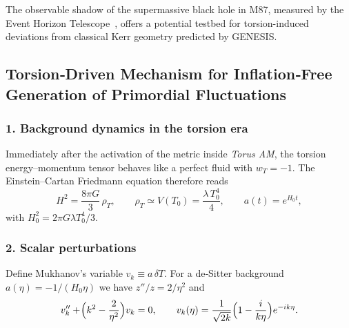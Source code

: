 \documentclass{article}
\begin{document}
The observable shadow of the supermassive black hole in M87, measured by the Event Horizon Telescope~\cite{eht2019}, offers a potential testbed for torsion-induced deviations from classical Kerr geometry predicted by GENESIS.


\medskip
\begin{center}
\end{center}
\medskip



\subsection{Torsion‑Driven Mechanism for Inflation‑Free
Generation of Primordial Fluctuations}
\label{sec:torsion_flucs}

\subsubsection*{1. Background dynamics in the torsion era}

Immediately after the activation of the metric inside
\textit{Torus AM}, the torsion energy–momentum tensor behaves
like a perfect fluid with
$w_{T}=-1$.  The Einstein–Cartan Friedmann equation therefore reads
\begin{equation}
  H^{2}=\frac{8\pi G}{3}\,\rho_{T},\qquad
  \rho_{T}\simeq V(T_{0})
  =\frac{\lambda\,T_{0}^{4}}{4},
  \qquad
  a(t)=e^{H_{0}t},
\end{equation}
with
$H_{0}^{2}=2\pi G\lambda T_{0}^{4}/3$.

\subsubsection*{2. Scalar perturbations}

Define Mukhanov’s variable $v_{k}\equiv a\,\delta T$.  
For a de‑Sitter background
$a(\eta)=-1/(H_{0}\eta)$ we have
$z''/z=2/\eta^{2}$ and
\begin{equation}
  v_{k}''+\!\Bigl(k^{2}-\frac{2}{\eta^{2}}\Bigr)v_{k}=0,
  \qquad
  v_{k}(\eta)=\frac{1}{\sqrt{2k}}
  \Bigl(1-\frac{i}{k\eta}\Bigr)e^{-ik\eta}.
\end{equation}
\end{document}
